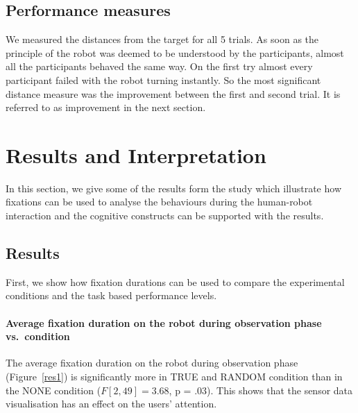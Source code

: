 \documentclass{sig-alternate}
\begin{document}
\subsection{Performance measures}


We measured the distances from the target for all 5 trials. As soon as the principle of the robot was deemed to be understood by the participants, almost all the participants behaved the same way. On the first try almost every participant failed with the robot turning instantly. So the most significant distance measure was the
improvement between the first and second trial. It is referred to as improvement in the next section.




\section{Results and Interpretation}
\label{interpretation}

In this section, we give some of the results form the study which illustrate how fixations can be used to analyse the behaviours during the human-robot interaction and the cognitive constructs can be supported with the results.

\subsection{Results}

First, we show how fixation durations can be used to compare the experimental conditions and the task based performance levels.

\paragraph{Average fixation duration on the robot during observation phase
vs.~condition}

The average fixation duration on the robot during observation phase
(Figure~\ref{res1}) is significantly more in {\sf TRUE} and {\sf RANDOM} condition than in
the {\sf NONE} condition ($F[2,49]=3.68$, p = .03). This shows that the
sensor data visualisation has an effect on the users' attention.
\end{document}
